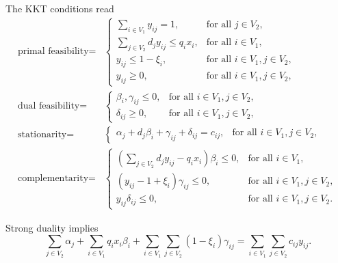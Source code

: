 The KKT conditions read
\begin{align*}
    \text{primal feasibility} = & 
    \begin{cases}
        \sum_{i\in V_1} y_{ij} = 1, & \text{for all } j\in V_2, \\
        \sum_{j\in V_2} d_jy_{ij} \le q_ix_i, & \text{for all } i\in V_1, \\
        y_{ij} \le 1 - \xi_i, & \text{for all } i\in V_1, j\in V_2, \\
        y_{ij} \ge 0, & \text{for all } i\in V_1, j\in V_2,
    \end{cases} \\
    \text{dual feasibility} = & 
    \begin{cases}
        \beta_i, \gamma_{ij} \le 0, &\text{for all } i\in V_1, j\in V_2, \\
        \delta_{ij} \ge 0, &\text{for all } i\in V_1, j\in V_2,
    \end{cases} \\
    \text{stationarity} = & 
    \begin{cases}
        \alpha_j + d_j\beta_i + \gamma_{ij} + \delta_{ij} = c_{ij}, & \text{for all } i\in V_1, j\in V_2,
    \end{cases} \\
    \text{complementarity} = & 
    \begin{cases}
        \left( \sum_{j\in V_2} d_jy_{ij} - q_ix_i \right) \beta_i \le 0, & \text{for all } i\in V_1, \\
        \left( y_{ij} - 1 + \xi_i \right) \gamma_{ij} \le 0, & \text{for all } i\in V_1, j\in V_2, \\
        y_{ij}\delta_{ij} \le 0, & \text{for all } i\in V_1, j\in V_2.
    \end{cases}
\end{align*}

Strong duality implies
\begin{equation}
    \sum_{j\in V_2} \alpha_j + \sum_{i\in V_1} q_ix_i\beta_i + \sum_{i\in V_1}\sum_{j\in V_2} \left( 1 - \xi_i \right)\gamma_{ij}
    = \sum_{i\in V_1} \sum_{j\in V_2} c_{ij} y_{ij}.
\end{equation}

